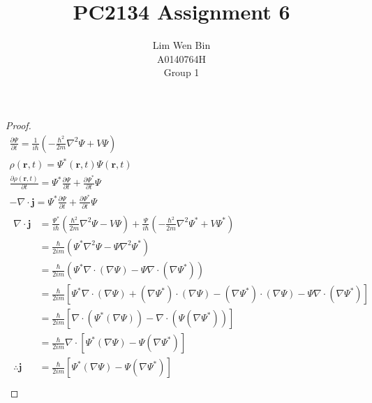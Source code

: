 \documentclass[12pt]{article}
\newenvironment{problem}[2][Problem]{\begin{trivlist}
\item[\hskip \labelsep {\bfseries #1}\hskip \labelsep {\bfseries #2.}]}{\end{trivlist}}
\begin{document}
\title{PC2134 Assignment 6}
\author{Lim Wen Bin \\
A0140764H\\
Group 1}
\maketitle

\begin{problem}{1.a.i}
\end{problem}
\begin{proof}
\begin{gather*}
	\frac{\partial \Psi}{\partial t} = \frac{1}{i\hbar}
	\left(-\frac{\hbar^2}{2m} \nabla^2 \Psi + V\Psi \right) \\
	\rho(\mathbf{r},t) = \Psi^*(\mathbf{r}, t) \Psi(\mathbf{r}, t)\\
	\frac{\partial \rho(\mathbf{r},t)}{\partial t} = 
		\Psi^* \frac{\partial \Psi}{\partial t} +
		\frac{\partial \Psi^*}{\partial t} \Psi \\
	-\nabla \cdot \mathbf{j} = 
		\Psi^* \frac{\partial \Psi}{\partial t} +
		\frac{\partial \Psi^*}{\partial t} \Psi \\
	\begin{aligned}
		\nabla \cdot \mathbf{j} &= 
			\frac{\Psi^*}{i\hbar} \left(\frac{\hbar^2}{2m} \nabla^2 \Psi -
			V\Psi \right)
			+ \frac{\Psi}{i\hbar} \left(- \frac{\hbar^2}{2m} \nabla^2 \Psi^* +
			V\Psi^* \right) \\
		&= \frac{\hbar}{2im} ( \Psi^* \nabla^2 \Psi - \Psi \nabla^2 \Psi^*) \\
		&= \frac{\hbar}{2im} ( \Psi^* \nabla \cdot (\nabla \Psi) - \Psi \nabla
			\cdot (\nabla \Psi^*)) \\
		&= \frac{\hbar}{2im} [ \Psi^* \nabla \cdot (\nabla \Psi) 
			+ (\nabla \Psi^*) \cdot (\nabla \Psi)
			- (\nabla \Psi^*) \cdot (\nabla \Psi)
			- \Psi \nabla \cdot (\nabla \Psi^*)]
			\\
		&= \frac{\hbar}{2im} [ \nabla \cdot (\Psi^* (\nabla \Psi))
			- \nabla \cdot (\Psi (\nabla \Psi^*))]
			\\
		&= \frac{\hbar}{2im} \nabla \cdot [ \Psi^* (\nabla \Psi)
			- \Psi (\nabla \Psi^*)]
			\\
		\therefore \mathbf{j} &= 
			\frac{\hbar}{2im} [ \Psi^* (\nabla \Psi)
			- \Psi (\nabla \Psi^*)]
			\\
	\end{aligned}
\end{gather*}
\end{proof}
\filbreak
\end{document}
